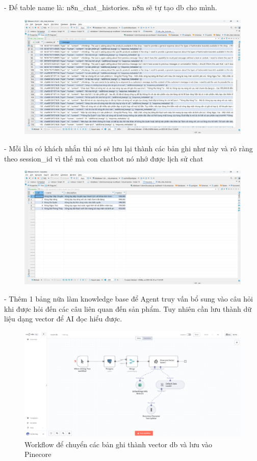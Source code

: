 - Để table name là: n8n\_chat\_histories. n8n sẽ tự tạo db cho mình.


\begin{figure}[htbp]
    \centering
    \includegraphics[width=1\linewidth]{Chap1-7/db-data.pdf}
\end{figure}
- Mỗi lần có khách nhắn thì nó sẽ lưu lại thành các bản ghi như này và rõ ràng theo session\_id vì thế mà con chatbot nó nhớ được lịch sử chat

\begin{figure}[htbp]
    \centering
    \includegraphics[width=1\linewidth]{Chap1-7/db-data-vong.pdf}
\end{figure}

- Thêm 1 bảng nữa làm knowledge base để Agent truy vấn bổ sung vào câu hỏi khi được hỏi đến các câu liên quan đến sản phẩm. Tuy nhiên cần lưu thành dữ liệu dạng vector để AI đọc hiểu được.

\begin{figure}[htbp]
    \centering
    \includegraphics[width=1\linewidth]{Chap1-7/insertdb.pdf}
    \caption{Workflow để chuyển các bản ghi thành vector db và lưu vào Pinecore}
\end{figure}

